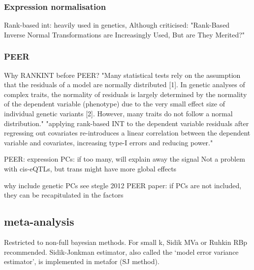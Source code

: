 \subsubsection{Expression normalisation}

Rank-based int:
heavily used in genetics, 
    Although criticised: "Rank-Based Inverse Normal Transformations are Increasingly Used, But are They Merited?"

\subsubsection{PEER}

Why RANKINT before PEER?
"Many statistical tests rely on the assumption that the residuals of a model are normally distributed [1]. In genetic analyses of complex traits, the normality of residuals is largely determined by the normality of the dependent variable (phenotype) due to the very small effect size of individual genetic variants [2]. However, many traits do not follow a normal distribution."
"applying rank-based INT to the dependent variable residuals after regressing out covariates re-introduces a linear correlation between the dependent variable and covariates, increasing type-I errors and reducing power."

PEER:
expression PCs: if too many, will explain away the signal
Not a problem with cis-eQTLs, but trans might have more global effects

why include genetic PCs
see stegle 2012 PEER paper: if PCs are not included, they can be recapitulated in the factors

\subsection{ meta-analysis}

Restricted to non-full bayesian methods.
For small k, Sidik MVa or Ruhkin RBp recommended.
Sidik-Jonkman estimator, also called the ‘model error variance estimator’, is implemented in metafor (SJ method).

